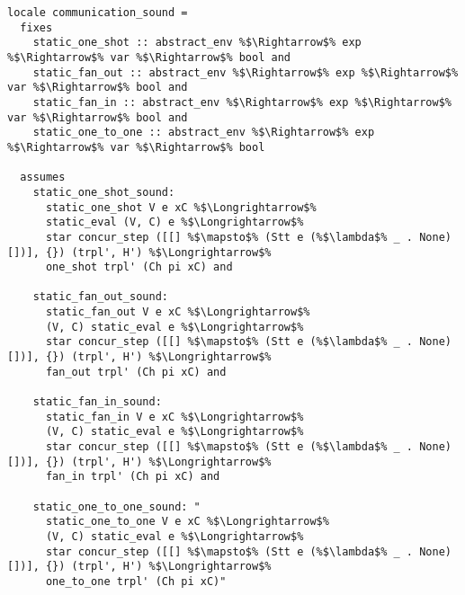 \documentclass{article}
\begin{document}
\begin{lstlisting}[style=codestyle1, escapechar=\%]
locale communication_sound =
  fixes 
    static_one_shot :: abstract_env %$\Rightarrow$% exp %$\Rightarrow$% var %$\Rightarrow$% bool and
    static_fan_out :: abstract_env %$\Rightarrow$% exp %$\Rightarrow$% var %$\Rightarrow$% bool and 
    static_fan_in :: abstract_env %$\Rightarrow$% exp %$\Rightarrow$% var %$\Rightarrow$% bool and
    static_one_to_one :: abstract_env %$\Rightarrow$% exp %$\Rightarrow$% var %$\Rightarrow$% bool

  assumes 
    static_one_shot_sound:
      static_one_shot V e xC %$\Longrightarrow$%
      static_eval (V, C) e %$\Longrightarrow$%
      star concur_step ([[] %$\mapsto$% (Stt e (%$\lambda$% _ . None) [])], {}) (trpl', H') %$\Longrightarrow$%
      one_shot trpl' (Ch pi xC) and

    static_fan_out_sound: 
      static_fan_out V e xC %$\Longrightarrow$%
      (V, C) static_eval e %$\Longrightarrow$%
      star concur_step ([[] %$\mapsto$% (Stt e (%$\lambda$% _ . None) [])], {}) (trpl', H') %$\Longrightarrow$%
      fan_out trpl' (Ch pi xC) and

    static_fan_in_sound:
      static_fan_in V e xC %$\Longrightarrow$%
      (V, C) static_eval e %$\Longrightarrow$%
      star concur_step ([[] %$\mapsto$% (Stt e (%$\lambda$% _ . None) [])], {}) (trpl', H') %$\Longrightarrow$%
      fan_in trpl' (Ch pi xC) and

    static_one_to_one_sound: "
      static_one_to_one V e xC %$\Longrightarrow$%
      (V, C) static_eval e %$\Longrightarrow$%
      star concur_step ([[] %$\mapsto$% (Stt e (%$\lambda$% _ . None) [])], {}) (trpl', H') %$\Longrightarrow$%
      one_to_one trpl' (Ch pi xC)"
  \end{lstlisting}
\end{document}
